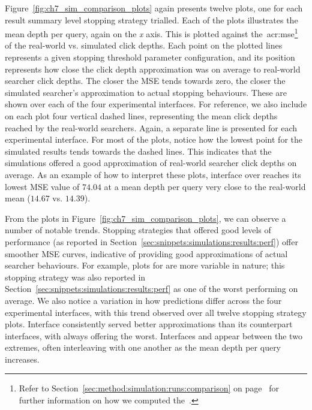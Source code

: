 Figure~\ref{fig:ch7_sim_comparison_plots} again presents twelve plots, one for each result summary level stopping strategy trialled. Each of the plots illustrates the mean depth per query, again on the \emph{x} axis. This is plotted against the~\gls{acr:mse}\footnote{Refer to Section~\ref{sec:method:simulation:runs:comparison} on page~\pageref{sec:method:simulation:runs:comparison} for further information on how we computed the~.} of the real-world vs. simulated click depths. Each point on the plotted lines represents a given stopping threshold parameter configuration, and its position represents how close the click depth approximation was on average to real-world searcher click depths. The closer the MSE tends towards zero, the closer the simulated searcher's approximation to actual stopping behaviours. These are shown over each of the four experimental interfaces. For reference, we also include on each plot four vertical dashed lines, representing the mean click depths reached by the real-world searchers. Again, a separate line is presented for each experimental interface. For most of the plots, notice how the lowest point for the simulated results tends towards the dashed lines. This indicates that the simulations offered a good approximation of real-world searcher click depths on average. As an example of how to interpret these plots, interface  over  reaches its lowest MSE value of $74.04$ at a mean depth per query very close to the real-world mean ($14.67$ vs. $14.39$).

From the plots in Figure~\ref{fig:ch7_sim_comparison_plots}, we can observe a number of notable trends. Stopping strategies that offered good levels of performance (as reported in Section~\ref{sec:snippets:simulations:results:perf}) offer smoother MSE curves, indicative of providing good approximations of actual searcher behaviours. For example, plots for  are more variable in nature; this stopping strategy was also reported in Section~\ref{sec:snippets:simulations:results:perf} as one of the worst performing on average. We also notice a variation in how predictions differ across the four experimental interfaces, with this trend observed over all twelve stopping strategy plots. Interface  consistently served better approximations than its counterpart interfaces, with  always offering the worst. Interfaces  and  appear between the two extremes, often interleaving with one another as the mean depth per query increases.

